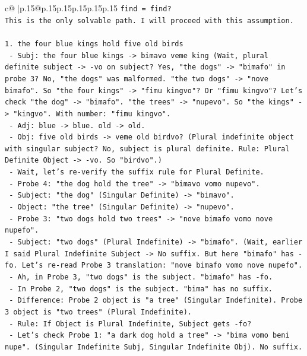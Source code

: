 \documentclass{article}
\begin{document}
{\begin{supertabular}{c@{$\;$}|p{.15\linewidth}@{}p{.15\linewidth}p{.15\linewidth}p{.15\linewidth}p{.15\linewidth}p{.15\linewidth}}
{{{\texttt{find = find?} \\
\texttt{This is the only solvable path. I will proceed with this assumption.} \\
\\ 
\texttt{1. the four blue kings hold five old birds} \\
\texttt{   {-} Subj: the four blue kings {-}> bimavo veme king (Wait, plural definite subject {-}> {-}vo on subject? Yes, "the dogs" {-}> "bimafo" in probe 3? No, "the dogs" was malformed. "the two dogs" {-}> "nove bimafo". So "the four kings" {-}> "fimu kingvo"? Or "fimu kingvo"? Let's check "the dog" {-}> "bimafo". "the trees" {-}> "nupevo". So "the kings" {-}> "kingvo". With number: "fimu kingvo".} \\
\texttt{   {-} Adj: blue {-}> blue. old {-}> old.} \\
\texttt{   {-} Obj: five old birds {-}> veme old birdvo? (Plural indefinite object with singular subject? No, subject is plural definite. Rule: Plural Definite Object {-}> {-}vo. So "birdvo".)} \\
\texttt{   {-} Wait, let's re{-}verify the suffix rule for Plural Definite.} \\
\texttt{     {-} Probe 4: "the dog hold the tree" {-}> "bimavo vomo nupevo".} \\
\texttt{     {-} Subject: "the dog" (Singular Definite) {-}> "bimavo".} \\
\texttt{     {-} Object: "the tree" (Singular Definite) {-}> "nupevo".} \\
\texttt{     {-} Probe 3: "two dogs hold two trees" {-}> "nove bimafo vomo nove nupefo".} \\
\texttt{     {-} Subject: "two dogs" (Plural Indefinite) {-}> "bimafo". (Wait, earlier I said Plural Indefinite Subject {-}> No suffix. But here "bimafo" has {-}fo. Let's re{-}read Probe 3 translation: "nove bimafo vomo nove nupefo".} \\
\texttt{     {-} Ah, in Probe 3, "two dogs" is the subject. "bimafo" has {-}fo.} \\
\texttt{     {-} In Probe 2, "two dogs" is the subject. "bima" has no suffix.} \\
\texttt{     {-} Difference: Probe 2 object is "a tree" (Singular Indefinite). Probe 3 object is "two trees" (Plural Indefinite).} \\
\texttt{     {-} Rule: If Object is Plural Indefinite, Subject gets {-}fo?} \\
\texttt{     {-} Let's check Probe 1: "a dark dog hold a tree" {-}> "bima vomo beni nupe". (Singular Indefinite Subj, Singular Indefinite Obj). No suffix.} \\
}}}
\end{supertabular}}
\end{document}
